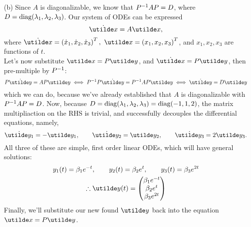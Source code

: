 \documentclass[a4paper,12pt]{report}
\begin{document}
\newpage
\sol (b)
Since $A$ is diagonalizable, we know that $P^{-1} AP = D$, where $D=\operatorname{diag}(\lambda_1,\lambda_2,\lambda_3)$.
Our system of ODEs can be expressed
$$
  \dot{\ut{x}} = A\ut{x},
$$
where $\dot{\ut{x}} = \bracks{\dot{x}_1, \dot{x}_2, \dot{x}_3}^T,\ \ut{x} = \bracks{x_1, x_2, x_3}^T$, and $x_1, x_2, x_3$ are functions of $t$. \\
Let's now substitute $\ut{x}=P\ut{y}$, and $\dot{\ut{x}} = P\ut{y}$, then pre-multiple by $P^{-1}$:
$$
  P\dot{\ut{y}} = AP\ut{y} \iff P\inv P\dot{\ut{y}} = P\inv AP\ut{y} \iff \dot{\ut{y}} = D\ut{y}
$$
which we can do, because we've already established that $A$ is diagonalizable with $P^{-1} AP = D$. Now, because $D=\operatorname{diag}(\lambda_1,\lambda_2,\lambda_3) = \operatorname{diag}(-1,1,2)$, the matrix multipliaction on the RHS is trivial, and successfully decouples the differential equations, namely,
$$
  \dot{\ut{y}_1} = -\ut{y}_1,\qquad \dot{\ut{y}_2} = \ut{y}_2,\qquad \dot{\ut{y}_3} = 2\ut{y}_3.
$$
All three of these are simple, first order linear ODEs, which will have general solutions:
\begin{gather*}
  y_1(t) = \beta_1e^{-t},\qquad y_2(t) = \beta_2e^t,\qquad y_3(t) = \beta_3e^{2t} \\
  \tf \ut{y}(t) = \begin{pmatrix} \beta_1e^{-t} \\ \beta_2e^t \\ \beta_3e^{2t} \end{pmatrix}
\end{gather*}
Finally, we'll substitute our new found $\ut{y}$ back into the equation $\ut{x}=P\ut{y}$.
\end{document}
